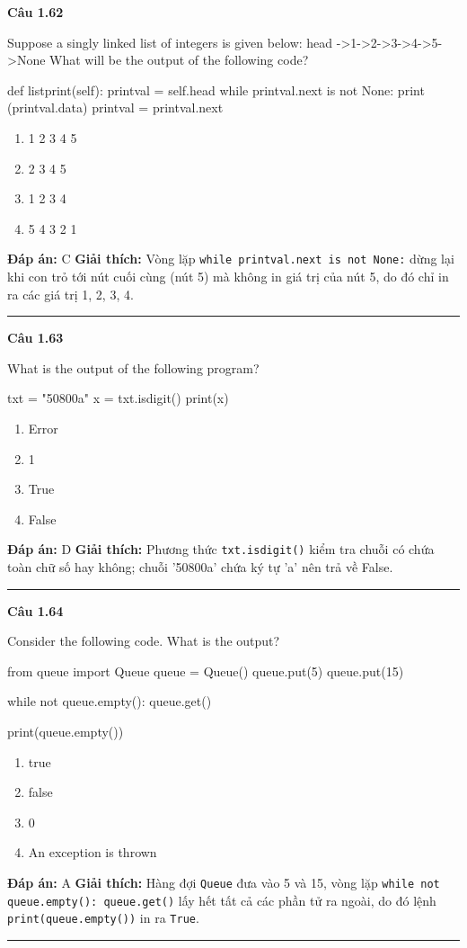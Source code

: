 \documentclass[11pt,a4paper]{article}
\newenvironment{question}[1]{%
  \par\vspace{1em}\noindent\textbf{\large Câu #1}\par\vspace{0.4em}
}{%
  \par\vspace{1em}\hrule\vspace{0.6em}
}
\newenvironment{choices}{%
  \begin{enumerate}[label=\textbf{\Alph*.},leftmargin=2.2em,itemsep=2pt,topsep=3pt]
}{%
  \end{enumerate}
}
\newcommand{\choice}{\item}
\newenvironment{codebox}{%
  \begin{tcolorbox}[colback=gray!8!white,colframe=gray!50!black,arc=1.5mm,boxrule=0.6pt,left=3mm,right=3mm,top=2.5mm,bottom=2.5mm]
  \ttfamily\small
}{%
  \end{tcolorbox}
}
\begin{document}
\begin{question}{1.62}
Suppose a singly linked list of integers is given below: head ->1->2->3->4->5->None What will be the output of the following code?
\begin{codebox}
def listprint(self):
    printval = self.head
    while printval.next is not None:
        print (printval.data)
        printval = printval.next
\end{codebox}
\begin{choices}
\choice 1 2 3 4 5
\choice 2 3 4 5
\choice 1 2 3 4
\choice 5 4 3 2 1
\end{choices}
\textbf{Đáp án:} C
\textbf{Giải thích:} Vòng lặp \texttt{while printval.next is not None:} dừng lại khi con trỏ tới nút cuối cùng (nút 5) mà không in giá trị của nút 5, do đó chỉ in ra các giá trị 1, 2, 3, 4.
\end{question}

\begin{question}{1.63}
What is the output of the following program?
\begin{codebox}
txt = "50800a"
x = txt.isdigit()
print(x)
\end{codebox}
\begin{choices}
\choice Error
\choice 1
\choice True
\choice False
\end{choices}
\textbf{Đáp án:} D
\textbf{Giải thích:} Phương thức \texttt{txt.isdigit()} kiểm tra chuỗi có chứa toàn chữ số hay không; chuỗi '50800a' chứa ký tự 'a' nên trả về False.
\end{question}

\begin{question}{1.64}
Consider the following code. What is the output?
\begin{codebox}
from queue import Queue
queue = Queue()
queue.put(5)
queue.put(15)

while not queue.empty():
    queue.get()

print(queue.empty())
\end{codebox}
\begin{choices}
\choice true
\choice false
\choice 0
\choice An exception is thrown
\end{choices}
\textbf{Đáp án:} A
\textbf{Giải thích:} Hàng đợi \texttt{Queue} đưa vào 5 và 15, vòng lặp \texttt{while not queue.empty(): queue.get()} lấy hết tất cả các phần tử ra ngoài, do đó lệnh \texttt{print(queue.empty())} in ra \texttt{True}.
\end{question}
\end{document}
